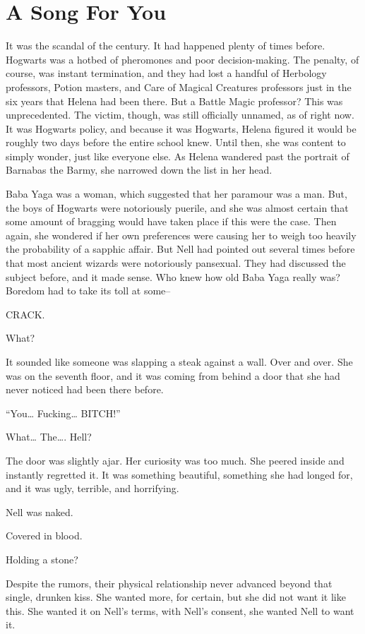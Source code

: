\chapter{A Song For You}

It was the scandal of the century. It had happened plenty of times before. Hogwarts was a hotbed of pheromones and poor decision-making. The penalty, of course, was instant termination, and they had lost a handful of Herbology professors, Potion masters, and Care of Magical Creatures professors just in the six years that Helena had been there. But a Battle Magic professor? This was unprecedented. The victim, though, was still officially unnamed, as of right now. It was Hogwarts policy, and because it was Hogwarts, Helena figured it would be roughly two days before the entire school knew. Until then, she was content to simply wonder, just like everyone else. As Helena wandered past the portrait of Barnabas the Barmy, she narrowed down the list in her head.

Baba Yaga was a woman, which suggested that her paramour was a man. But, the boys of Hogwarts were notoriously puerile, and she was almost certain that some amount of bragging would have taken place if this were the case. Then again, she wondered if her own preferences were causing her to weigh too heavily the probability of a sapphic affair. But Nell had pointed out several times before that most ancient wizards were notoriously pansexual. They had discussed the subject before, and it made sense. Who knew how old Baba Yaga really was? Boredom had to take its toll at some–

CRACK.

What?

It sounded like someone was slapping a steak against a wall. Over and over. She was on the seventh floor, and it was coming from behind a door that she had never noticed had been there before.

“You… Fucking… BITCH!”

What… The…. Hell?

The door was slightly ajar. Her curiosity was too much. She peered inside and instantly regretted it. It was something beautiful, something she had longed for, and it was ugly, terrible, and horrifying.

Nell was naked.

Covered in blood.

Holding a stone?

Despite the rumors, their physical relationship never advanced beyond that single, drunken kiss. She wanted more, for certain, but she did not want it like this. She wanted it on Nell’s terms, with Nell’s consent, she wanted Nell to want it.

